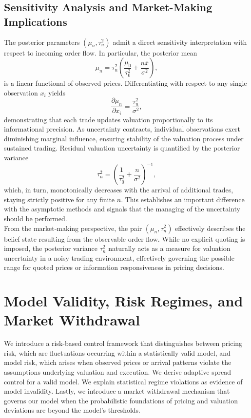 \documentclass[12pt]{article}
\theoremstyle{plain}
\theoremstyle{definition}
\numberwithin{equation}{section}
\begin{document}
\subsection{Sensitivity Analysis and Market-Making Implications}
The posterior parameters $(\mu_n, \tau_n^2)$ admit a direct sensitivity interpretation with respect to incoming order flow. In particular, the posterior mean
\begin{equation}
\mu_n=\tau_n^2 \left( \frac{\mu_0}{\tau_0^2} + \frac{n\bar{x}}{\sigma^2} \right),
\end{equation}
is a linear functional of observed prices. Differentiating with respect to any single observation $x_i$ yields
\begin{equation}
\frac{\partial \mu_n}{\partial x_i} = \frac{\tau_n^2}{\sigma^2},
\end{equation}
demonstrating that each trade updates valuation proportionally to its informational precision. As uncertainty contracts, individual observations exert diminishing marginal influence, ensuring stability of the valuation process under sustained trading.
Residual valuation uncertainty is quantified by the posterior variance
\begin{equation}
\tau_n^2 = \left(
\frac{1}{\tau_0^2} + \frac{n}{\sigma^2} \right)^{-1},
\end{equation}
which, in turn, monotonically decreases with the arrival of additional trades, staying strictly positive for any finite $n$. This establishes an important difference with the asymptotic methods and signals that the managing of the uncertainty should be performed.\\

From the market-making perspective, the pair $(\mu_n,\tau_n^2)$ effectively describes the belief state resulting from the observable order flow. While no explicit quoting is imposed, the posterior variance $\tau_n^2$ naturally acts as a measure for valuation uncertainty in a noisy trading environment, effectively governing the possible range for quoted prices or information responsiveness in pricing decisions.

\section{Model Validity, Risk Regimes, and Market Withdrawal}

We introduce a risk-based control framework that distinguishes between pricing risk, which are fluctuations occurring within a statistically valid model, and model risk, which arises when observed prices or arrival patterns violate the assumptions underlying valuation and execution. We derive adaptive spread control for a valid model. We explain statistical regime violations as evidence of model invalidity. Lastly, we introduce a market withdrawal mechanism that governs our model when the probabilistic foundations of pricing and valuation deviations are beyond the model's thresholds.
\end{document}
